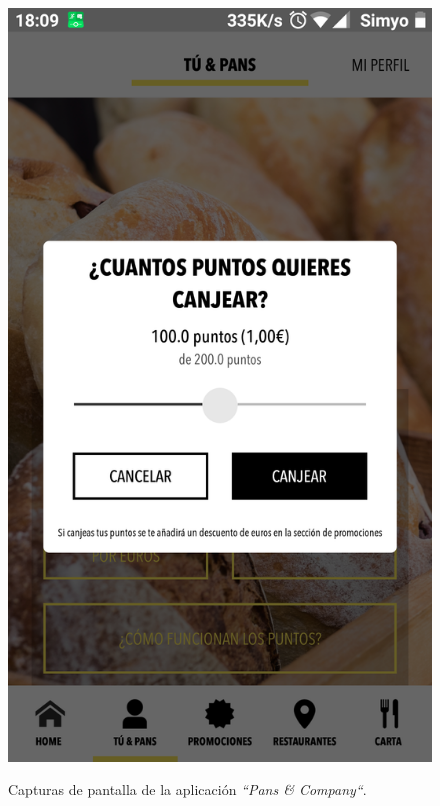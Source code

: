 \documentclass[twoside]{report}
\begin{document}
\begin{figure}[H]
\begin{center}
\includegraphics[scale=0.25]{images/restaurantes/pans2.png}
\caption{Capturas de pantalla de la aplicación \textit{“Pans \& Company“}.} \cite{pansapp}
\end{center}
\end{figure}
\end{document}
